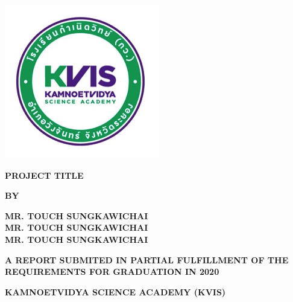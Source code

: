 \begin{center}
\includegraphics[scale=0.8]{static/logo.png}
\vspace{20px}
\fontsize{16}{23}\selectfont

\textbf{PROJECT TITLE}
\vspace{70px}

\fontheading
\textbf{BY}
\vspace{40px}

\textbf{MR. TOUCH SUNGKAWICHAI} \\
\textbf{MR. TOUCH SUNGKAWICHAI} \\
\textbf{MR. TOUCH SUNGKAWICHAI} \\
\vspace{150px}

\textbf{A REPORT SUBMITED IN PARTIAL FULFILLMENT OF THE REQUIREMENTS FOR GRADUATION IN 2020}

\vspace{50px}
\textbf{KAMNOETVIDYA SCIENCE ACADEMY (KVIS)} 

\end{center}